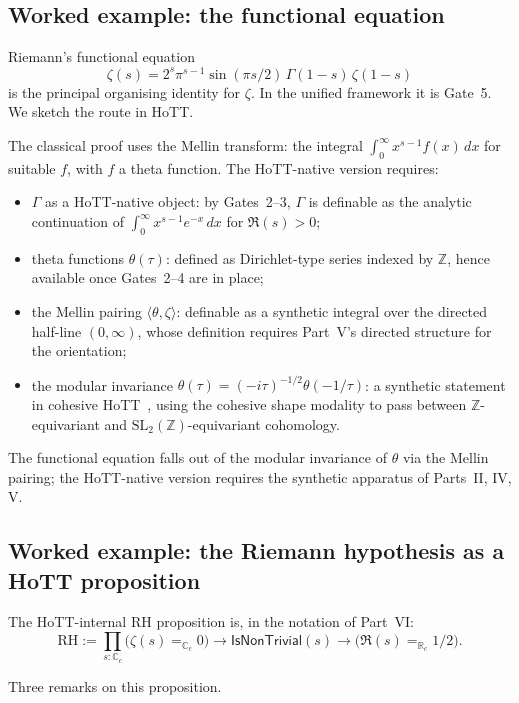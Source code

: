 \documentclass[12pt]{article}
\theoremstyle{definition}
\theoremstyle{remark}
\newcommand{\Z}{\mathbb{Z}}
\newcommand{\R}{\mathbb{R}}
\newcommand{\C}{\mathbb{C}}
\newcommand{\Rc}{\R_{c}}
\newcommand{\Cc}{\C_{c}}
\begin{document}
\subsection{Worked example: the functional equation}

Riemann's functional equation
\[
\zeta(s) = 2^s \pi^{s-1} \sin(\pi s / 2)\, \Gamma(1-s)\, \zeta(1-s)
\]
is the principal organising identity for $\zeta$. In the unified
framework it is Gate~5. We sketch the route in HoTT\@.

The classical proof uses the Mellin transform: the integral
$\int_0^\infty x^{s-1} f(x)\,dx$ for suitable $f$, with $f$ a theta
function. The HoTT-native version requires:
\begin{itemize}[leftmargin=*]
\item $\Gamma$ as a HoTT-native object: by Gates~2--3, $\Gamma$ is
      definable as the analytic continuation of $\int_0^\infty
      x^{s-1} e^{-x}\,dx$ for $\Re(s) > 0$;
\item theta functions $\theta(\tau)$: defined as Dirichlet-type series
      indexed by $\Z$, hence available once Gates~2--4 are in place;
\item the Mellin pairing $\langle\theta,\zeta\rangle$: definable as a
      synthetic integral over the directed half-line $(0,\infty)$,
      whose definition requires Part~V's directed structure for the
      orientation;
\item the modular invariance $\theta(\tau) = {(-i\tau)}^{-1/2}\theta(-1/\tau)$:
      a synthetic statement in cohesive HoTT~\cite{shulman-cohesive}, using
      the cohesive shape modality to pass between $\Z$-equivariant
      and $\mathrm{SL}_2(\Z)$-equivariant cohomology.
\end{itemize}

The functional equation falls out of the modular invariance of
$\theta$ via the Mellin pairing; the HoTT-native version requires
the synthetic apparatus of Parts~II, IV, V.

\subsection{Worked example: the Riemann hypothesis as a HoTT proposition}

The HoTT-internal RH proposition is, in the notation of Part~VI:
\[
\mathrm{RH} := \prod_{s : \Cc} \bigl(\zeta(s) =_{\Cc} 0\bigr) \to
\mathsf{IsNonTrivial}(s) \to \bigl(\Re(s) =_{\Rc} 1/2\bigr).
\]

Three remarks on this proposition.
\end{document}
